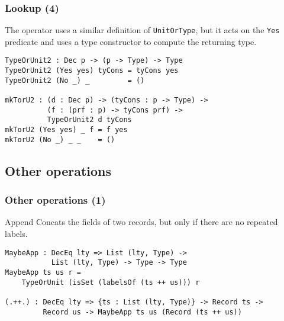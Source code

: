 \documentclass{beamer}
\begin{document}
\begin{frame}[fragile]
\frametitle{Lookup (4)}

The operator uses a similar definition of \texttt{UnitOrType}, but it acts on the \texttt{Yes} predicate and uses a type constructor to compute the returning type.

\begin{definition}
\begin{verbatim}
TypeOrUnit2 : Dec p -> (p -> Type) -> Type
TypeOrUnit2 (Yes yes) tyCons = tyCons yes
TypeOrUnit2 (No _) _         = ()

mkTorU2 : (d : Dec p) -> (tyCons : p -> Type) -> 
          (f : (prf : p) -> tyCons prf) ->
          TypeOrUnit2 d tyCons
mkTorU2 (Yes yes) _ f = f yes
mkTorU2 (No _) _ _    = ()
\end{verbatim}
\end{definition}

\end{frame}


\subsection{Other operations}

\begin{frame}[fragile]
\frametitle{Other operations (1)}

\begin{block}{Append}
Concats the fields of two records, but only if there are no repeated labels.

\begin{definition}
\begin{verbatim}
MaybeApp : DecEq lty => List (lty, Type) ->
           List (lty, Type) -> Type -> Type
MaybeApp ts us r = 
    TypeOrUnit (isSet (labelsOf (ts ++ us))) r

(.++.) : DecEq lty => {ts : List (lty, Type)} -> Record ts -> 
         Record us -> MaybeApp ts us (Record (ts ++ us))
\end{verbatim}
\end{definition}

\end{block}

\end{frame}
\end{document}
